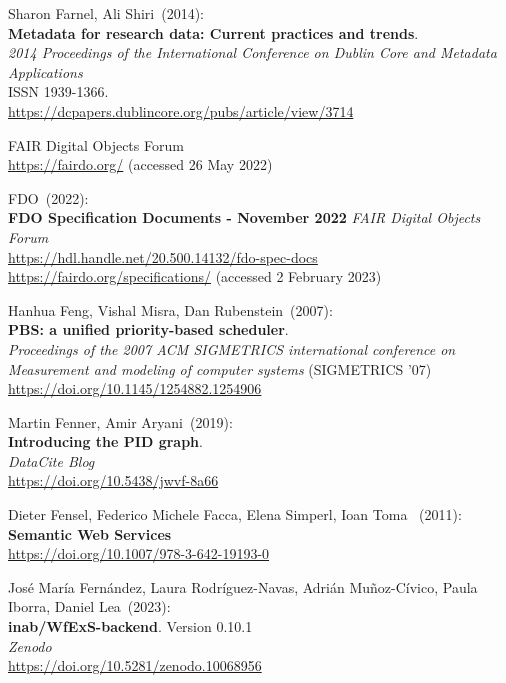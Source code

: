 \begin{thebibliography}{9}
Sharon Farnel, Ali Shiri~(2014): \\
\textbf{Metadata for research data: Current practices and trends}.\\
\emph{2014 Proceedings of the International Conference on Dublin Core and Metadata Applications}\\
ISSN 1939-1366.\\
\url{https://dcpapers.dublincore.org/pubs/article/view/3714}

FAIR Digital Objects Forum \\
\url{https://fairdo.org/} (accessed 26 May 2022)

FDO~(2022): \\
\textbf{{FDO Specification Documents - November 2022}}
\emph{FAIR Digital Objects Forum}\\
\url{https://hdl.handle.net/20.500.14132/fdo-spec-docs}\\
\url{https://fairdo.org/specifications/} 
(accessed 2 February 2023) 

Hanhua Feng, Vishal Misra, Dan Rubenstein~(2007): \\
\textbf{PBS: a unified priority-based scheduler}.\\
\emph{Proceedings of the 2007 ACM SIGMETRICS international conference on Measurement and modeling of computer systems} (SIGMETRICS '07)\\
\url{https://doi.org/10.1145/1254882.1254906} 

Martin Fenner, Amir Aryani~(2019): \\
\textbf{Introducing the PID graph}. \\
\emph{DataCite Blog}\\
\url{https://doi.org/10.5438/jwvf-8a66}

Dieter Fensel, Federico Michele Facca, Elena Simperl, Ioan Toma ~(2011): \\
\textbf{Semantic {Web Services}}\\
\url{https://doi.org/10.1007/978-3-642-19193-0}

José María Fernández, Laura Rodríguez-Navas, Adrián Muñoz-Cívico, Paula Iborra, Daniel Lea~(2023): \\
\textbf{inab/WfExS-backend}. Version 0.10.1\\
\emph{Zenodo} \\
\url{https://doi.org/10.5281/zenodo.10068956}


\end{thebibliography}
